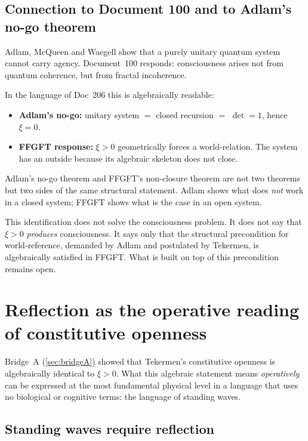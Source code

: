 \subsection{Connection to Document 100 and to Adlam's no-go theorem}

Adlam, McQueen and Waegell show that a purely unitary quantum system cannot carry agency. Document~100 responds: consciousness arises not from quantum coherence, but from fractal incoherence.

In the language of Doc~206 this is algebraically readable:

\begin{itemize}
\item \textbf{Adlam's no-go:} unitary system $=$ closed recursion $=$ $\det = 1$, hence $\xi = 0$.
\item \textbf{FFGFT response:} $\xi > 0$ geometrically forces a world-relation. The system has an outside because its algebraic skeleton does not close.
\end{itemize}

Adlam's no-go theorem and FFGFT's non-closure theorem are not two theorems but two sides of the same structural statement. Adlam shows what does \emph{not} work in a closed system; FFGFT shows what is the case in an open system.

\begin{interpretation}
This identification does not solve the consciousness problem. It does not say that $\xi > 0$ \emph{produces} consciousness. It says only that the structural precondition for world-reference, demanded by Adlam and postulated by Tekermen, is algebraically satisfied in FFGFT. What is built on top of this precondition remains open.
\end{interpretation}

\section{Reflection as the operative reading of constitutive openness}\label{sec:reflection}

Bridge~A (\ref{sec:bridgeA}) showed that Tekermen's constitutive openness is algebraically identical to $\xi > 0$. What this algebraic statement means \emph{operatively} can be expressed at the most fundamental physical level in a language that uses no biological or cognitive terms: the language of standing waves.

\subsection{Standing waves require reflection}\label{sec:reflection_standing}


